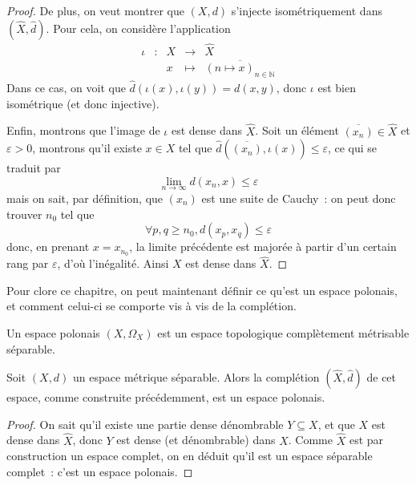 \begin{proof}
  De plus, on veut montrer que $(X,d)$ s'injecte isométriquement dans
  $(\hat X,\hat d)$. Pour cela, on considère l'application
  \[\begin{array}{ccccc}
  \iota & : & X & \longrightarrow & \hat X\\
  & & x & \longmapsto & \overline{(n \mapsto x)_{n\in \mathbb N}}
  \end{array}\]
  Dans ce cas, on voit que $\hat d(\iota(x),\iota(y)) = d(x,y)$, donc $\iota$
  est bien isométrique (et donc injective).

  Enfin, montrons que l'image de $\iota$ est dense dans $\hat X$. Soit un
  élément $\overline{(x_n)}\in\hat X$ et $\varepsilon > 0$, montrons qu'il
  existe $x\in X$ tel que $\hat d(\overline{(x_n)},\iota(x)) \leq\varepsilon$,
  ce qui se traduit par
  \[\lim_{n\to\infty} d(x_n,x) \leq \varepsilon\]
  mais on sait, par définition, que $(x_n)$ est une suite de Cauchy~: on peut
  donc trouver $n_0$ tel que
  \[\forall p,q \geq n_0, d(x_p,x_q) \leq\varepsilon\]
  donc, en prenant $x = x_{n_0}$, la limite précédente est majorée à partir
  d'un certain rang par $\varepsilon$, d'où l'inégalité. Ainsi $X$ est dense
  dans $\hat X$.
\end{proof}

Pour clore ce chapitre, on peut maintenant définir ce qu'est un espace polonais,
et comment celui-ci se comporte vis à vis de la complétion.

\begin{definition}
  Un espace polonais $(X,\Omega_X)$ est un espace topologique complètement
  métrisable séparable.
\end{definition}

\begin{proposition}
  Soit $(X,d)$ un espace métrique séparable. Alors la complétion
  $(\hat X,\hat d)$ de cet espace, comme construite précédemment, est un espace
  polonais.
\end{proposition}

\begin{proof}
  On sait qu'il existe une partie dense dénombrable $Y\subseteq X$, et que
  $X$ est dense dans $\hat X$, donc $Y$ est dense (et dénombrable) dans
  $\hat X$. Comme $\hat X$ est par construction un espace complet, on en déduit
  qu'il est un espace séparable complet~: c'est un espace polonais.
\end{proof}
